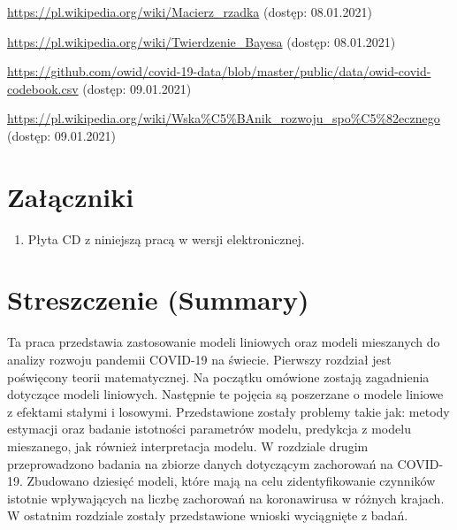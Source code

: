 \documentclass[12pt]{mwbk}
\theoremstyle{plain}
\theoremstyle{definition}
\theoremstyle{definition}
\begin{document}
\begin{thebibliography}{99}
 \url{https://pl.wikipedia.org/wiki/Macierz_rzadka} (dostęp: 08.01.2021)

 \url{https://pl.wikipedia.org/wiki/Twierdzenie_Bayesa} (dostęp: 08.01.2021)



 \url{https://github.com/owid/covid-19-data/blob/master/public/data/owid-covid-codebook.csv} (dostęp: 09.01.2021)

 \url{https://pl.wikipedia.org/wiki/Wska\%C5\%BAnik\_rozwoju\_spo\%C5\%82ecznego} (dostęp: 09.01.2021)



\end{thebibliography}



\listoffigures

\listoftables


\chapter*{Załączniki}
\begin{enumerate}
\item Płyta CD z niniejszą pracą w wersji elektronicznej.
\end{enumerate}




\chapter*{Streszczenie (Summary)}

\bigskip
\bigskip

\begin{center}
  \textbf{\tytul}
\end{center}

Ta praca przedstawia zastosowanie modeli liniowych oraz modeli mieszanych do analizy rozwoju pandemii COVID-19 na świecie. Pierwszy rozdział jest poświęcony teorii matematycznej. Na początku omówione zostają zagadnienia dotyczące modeli liniowych. Następnie te pojęcia są poszerzane o modele liniowe z efektami stałymi i losowymi. Przedstawione zostały problemy takie jak: metody estymacji oraz badanie istotności parametrów modelu, predykcja z modelu mieszanego, jak również interpretacja modelu. W rozdziale drugim przeprowadzono badania na zbiorze danych dotyczącym zachorowań na COVID-19. Zbudowano dziesięć modeli, które mają na celu zidentyfikowanie czynników istotnie wpływających na liczbę zachorowań na koronawirusa w różnych krajach. W ostatnim rozdziale zostały przedstawione wnioski wyciągnięte z badań.
\end{document}
